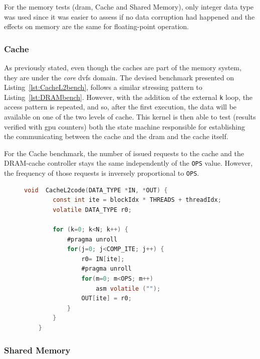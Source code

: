 For the memory tests (\acrshort{dram}, Cache and Shared Memory), only integer data type was used since it was easier to assess if no data corruption had happened and the effects on memory are the same for floating-point operation.


\subsubsection{Cache}

As previously stated, even though the caches are part of the memory system, they are under the \textit{core} \acrshort{dvfs} domain. The devised benchmark presented on   Listing~\ref{lst:CacheL2bench}, follows a similar stressing pattern to Listing~\ref{lst:DRAMbench}. However, with the addition of the external \texttt{k} loop, the access pattern is repeated, and so, after the first execution, the data will be available on one of the two levels of cache. This kernel is then able to test (results verified with \acrshort{gpu} counters) both the state machine responsible for establishing the communicating between the cache and the \acrshort{dram} and the cache itself.

For the Cache benchmark, the number of issued requests to the cache and the DRAM-cache controller stays the same independently of the \texttt{OPS} value. However, the frequency of those requests is inversely proportional to \texttt{OPS}.

\begin{figure}[h]
    \begin{lstlisting}[language=C, caption=CacheL2 Benchmark Code, label=lst:CacheL2bench, basicstyle=\footnotesize\ttfamily,abovecaptionskip=0pt, captionpos=b]
    void  CacheL2code(DATA_TYPE *IN, *OUT) {
        const int ite = blockIdx * THREADS + threadIdx;
        volatile DATA_TYPE r0;
        
        for (k=0; k<N; k++) {
            #pragma unroll
            for(j=0; j<COMP_ITE; j++) {
                r0= IN[ite];
                #pragma unroll
                for(m=0; m<OPS; m++)    
                    asm volatile ("");
                OUT[ite] = r0;
            }
        }
    }
    \end{lstlisting}
\end{figure}

\subsubsection{Shared Memory}

